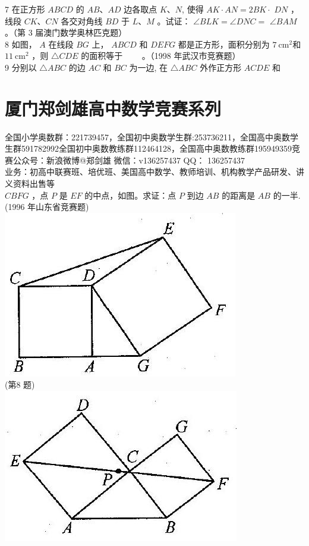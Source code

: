 \documentclass[10pt]{article}
\begin{document}
7 在正方形 $A B C D$ 的 $A B 、 A D$ 边各取点 $K 、 N$, 使得 $A K \cdot A N=2 B K \cdot$ $D N$ ，线段 $C K 、 C N$ 各交对角线 $B D$ 于 $L 、 M$ 。试证： $\angle B L K=\angle D N C=$ $\angle B A M$ 。（第 3 届澳门数学奥林匹克题）\\
8 如图， $A$ 在线段 $B G$ 上， $A B C D$ 和 $D E F G$ 都是正方形，面积分别为 $7 \mathrm{~cm}^{2}$和 $11 \mathrm{~cm}^{2}$ ，则 $\triangle C D E$ 的面积等于 $\qquad$。（1998 年武汉市竞赛题）\\
9 分别以 $\triangle A B C$ 的边 $A C$ 和 $B C$ 为一边, 在 $\triangle A B C$ 外作正方形 $A C D E$ 和

\section*{厦门郑剑雄高中数学竞赛系列}
全国小学奥数群：221739457，全国初中奥数学生群:253736211，全国高中奥数学生群591782992全国初中奥数教练群112464128，全国高中奥数教练群195949359竞赛公众号：新浪微博@郑剑雄 微信：v136257437 QQ： 136257437\\
业务：初高中联赛班、培优班、美国高中数学、教师培训、机构教学产品研发、讲义资料出售等\\
$C B F G$ ，点 $P$ 是 $E F$ 的中点，如图。求证：点 $P$ 到边 $A B$ 的距离是 $A B$ 的一半. (1996 年山东省竞赛题)\\
\includegraphics[max width=\textwidth, center]{2024_10_30_2c8f45efd4a519b08e1ag-136(4)}\\
(第8 题)\\
\includegraphics[max width=\textwidth, center]{2024_10_30_2c8f45efd4a519b08e1ag-136}\\
\end{document}
